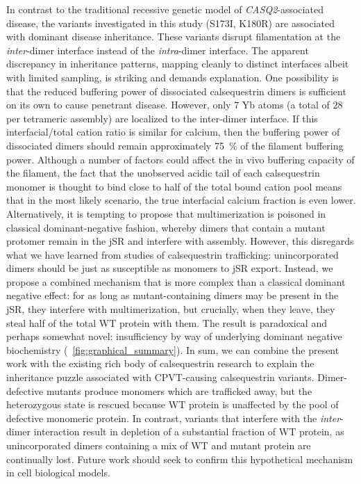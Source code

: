 In contrast to the traditional recessive genetic model of \textit{CASQ2}-associated disease, the variants investigated in this study (S173I, K180R) are associated with dominant disease inheritance. These variants disrupt filamentation at the \textit{inter}-dimer interface instead of the \textit{intra}-dimer interface. The apparent discrepancy in inheritance patterns, mapping cleanly to distinct interfaces albeit with limited sampling, is striking and demands explanation. One possibility is that the reduced buffering power of dissociated calsequestrin dimers is sufficient on its own to cause penetrant disease. However, only 7 Yb atoms (a total of 28 per tetrameric assembly) are localized to the inter-dimer interface. If this interfacial/total cation ratio is similar for calcium, then the buffering power of dissociated dimers should remain approximately \SI{75}{\percent} of the filament buffering power. Although a number of factors could affect the in vivo buffering capacity of the filament, the fact that the unobserved acidic tail of each calsequestrin monomer is thought to bind close to half of the total bound cation pool \supercite{Park2004-bu} means that in the most likely scenario, the true interfacial calcium fraction is even lower. Alternatively, it is tempting to propose that multimerization is poisoned in classical dominant-negative fashion, whereby dimers that contain a mutant protomer remain in the jSR and interfere with assembly. However, this disregards what we have learned from studies of calsequestrin trafficking: unincorporated dimers should be just as susceptible as monomers to jSR export. Instead, we propose a combined mechanism that is more complex than a classical dominant negative effect: for as long as mutant-containing dimers may be present in the jSR, they interfere with multimerization, but crucially, when they leave, they steal half of the total WT protein with them. The result is paradoxical and perhaps somewhat novel: insufficiency by way of underlying dominant negative biochemistry (\maintextfigure~\ref{fig:graphical_summary}). In sum, we can combine the present work with the existing rich body of calsequestrin research to explain the inheritance puzzle associated with CPVT-causing calsequestrin variants. Dimer-defective mutants produce monomers which are trafficked away, but the heterozygous state is rescued because WT protein is unaffected by the pool of defective monomeric protein. In contrast, variants that interfere with the \textit{inter}-dimer interaction result in depletion of a substantial fraction of WT protein, as unincorporated dimers containing a mix of WT and mutant protein are continually lost. Future work should seek to confirm this hypothetical mechanism in cell biological models.

